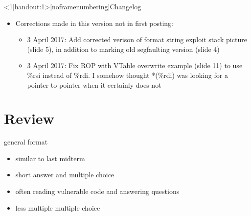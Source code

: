 \begin{frame}
    \titlepage
\end{frame}

{
\begin{frame}<1|handout:1>[noframenumbering]{Changelog}
    \begin{itemize}
        \item Corrections made in this version not in first posting:
        \begin{itemize}
            \item 3 April 2017: Add corrected verison of format string exploit stack picture (slide 5),
                in addition to marking old segfaulting version (slide 4)
            \item 3 April 2017: Fix ROP with VTable overwrite example (slide 11) to
            use \%rsi instead of \%rdi. I somehow thought *(\%rdi) was
            looking for a pointer to pointer when it certainly does not
        \end{itemize}
    \end{itemize}
\end{frame}
}

\section{Review}

\begin{frame}{general format}
    \begin{itemize}
    \item similar to last midterm
        \vspace{.5cm}
    \item short answer and multiple choice
    \item often reading vulnerable code and answering questions
    \item less multiple multiple choice
    \end{itemize}
\end{frame}

